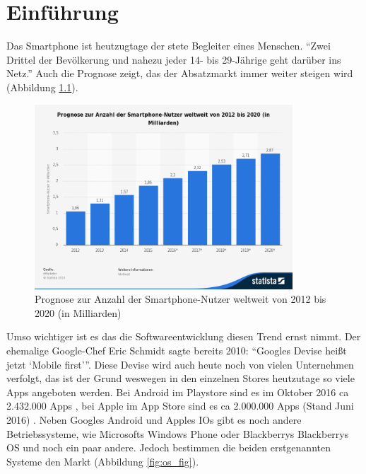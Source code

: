 \chapter{Einführung}\label{ch:intro}

Das Smartphone ist heutzugtage der stete Begleiter eines Menschen. \enquote{Zwei Drittel der Bevölkerung und nahezu jeder 14- bis 29-Jährige geht darüber ins Netz.} \cite{usage} Auch die Prognose zeigt, das der Absatzmarkt immer weiter steigen wird (Abbildung \ref{fig:prognose_fig}).

\begin{figure}[H]
	\begin{center}
		\includegraphics[width=0.86\textwidth]{images/prognose-zur-anzahl-der-smartphone-nutzer-weltweit-bis-2020.png}
		\caption{Prognose zur Anzahl der Smartphone-Nutzer weltweit von 2012 bis 2020 (in Milliarden) \cite{prognose}}
		\label{fig:prognose_fig}
	\end{center}
\end{figure}

Umso wichtiger ist es das die Softwareentwicklung diesen Trend ernst nimmt. Der ehemalige Google-Chef Eric Schmidt sagte bereits 2010: \enquote{Googles Devise heißt jetzt \enquote{Mobile first}}. 
Diese Devise wird auch heute noch von vielen Unternehmen verfolgt, das ist der Grund weswegen in den einzelnen Stores heutzutage so viele Apps angeboten werden. Bei Android im Playstore sind es im Oktober 2016 ca 2.432.000 Apps \cite{play_store}, bei Apple im App Store sind es ca 2.000.000 Apps (Stand Juni 2016) \cite{app_store}. Neben Googles Android und Apples IOs gibt es noch andere Betriebssysteme, wie Microsofts Windows Phone oder Blackberrys Blackberrys OS und noch ein paar andere. Jedoch bestimmen die beiden erstgenannten Systeme den Markt (Abbildung \ref{fig:os_fig}).

